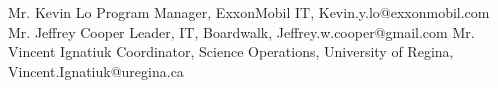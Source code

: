 \begin{cvhonors}
    \cvhonor
    {Mr. Kevin Lo}
    {Program Manager, ExxonMobil IT, Kevin.y.lo@exxonmobil.com}
    {}
    {}
    \cvhonor
    {Mr. Jeffrey Cooper}
    {Leader, IT, Boardwalk, Jeffrey.w.cooper@gmail.com}
    {}
    {}
    \cvhonor
    {Mr. Vincent Ignatiuk}
    {Coordinator, Science Operations, University of Regina, Vincent.Ignatiuk@uregina.ca}
    {}
    {}
\end{cvhonors}